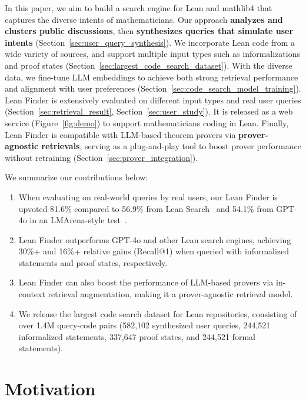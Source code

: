 \documentclass{article} %
\begin{document}
In this paper, we aim to build a search engine for Lean and mathlib4 that captures the diverse intents of mathematicians.
Our approach \textbf{analyzes and clusters public discussions}, then \textbf{synthesizes queries that simulate user intents} (Section~\ref{sec:user_query_synthesis}).
We incorporate Lean code from a wide variety of sources, and support multiple input types such as informalizations and proof states (Section~\ref{sec:largest_code_search_dataset}).
With the diverse data, we fine-tune LLM embeddings to achieve both strong retrieval performance and alignment with user preferences (Section~\ref{sec:code_search_model_training}).
Lean Finder is extensively evaluated on different input types and real user queries (Section~\ref{sec:retrieval_result}, Section~\ref{sec:user_study}).  It is released as a web service (Figure~\ref{fig:demo}) to support mathematicians coding in Lean.
Finally, Lean Finder is compatible with LLM-based theorem provers via \textbf{prover-agnostic retrievals}, serving as a plug-and-play tool to boost prover performance without retraining (Section~\ref{sec:prover_integration}).

We summarize our contributions below:
\begin{enumerate}[leftmargin=*]
    \item
When evaluating on real-world queries by real users,
our Lean Finder is upvoted 81.6\% compared to 56.9\% from Lean Search~\citep{LeanSearch} and 54.1\% from GPT-4o in an LMArena-style test~\citep{chiang2024chatbot}.

    \item
Lean Finder outperforms GPT-4o and other Lean search engines, achieving 30\%+ and 16\%+ relative gains (Recall@1) when queried with informalized statements and proof states, respectively.

    \item
Lean Finder can also boost the performance of LLM-based provers via in-context retrieval augmentation, making it a prover-agnostic retrieval model.

    \item
We release the largest code search dataset for Lean repositories, consisting of over 1.4M query-code pairs (582,102 synthesized user queries, 244,521 informalized statements, 337,647 proof states, and 244,521 formal statements).

\end{enumerate}

\section{Motivation}
\end{document}
